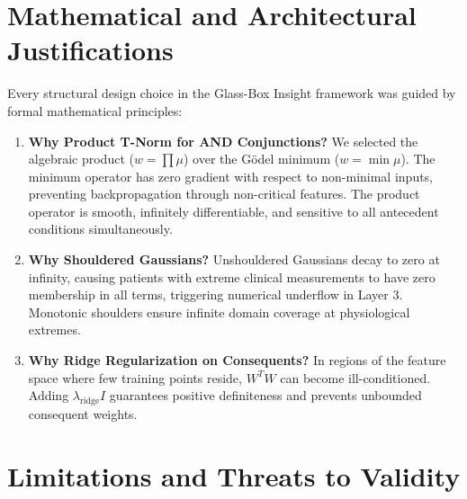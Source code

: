 \documentclass{report}
\begin{document}
\section{Mathematical and Architectural Justifications}

Every structural design choice in the Glass-Box Insight framework was guided by formal mathematical principles:
\begin{enumerate}
    \setlength{\itemsep}{1pt}
    \setlength{\parskip}{0pt}
    \item \textbf{Why Product T-Norm for AND Conjunctions?} We selected the algebraic product ($w = \prod \mu$) over the Gödel minimum ($w = \min \mu$). The minimum operator has zero gradient with respect to non-minimal inputs, preventing backpropagation through non-critical features. The product operator is smooth, infinitely differentiable, and sensitive to all antecedent conditions simultaneously.
    \item \textbf{Why Shouldered Gaussians?} Unshouldered Gaussians decay to zero at infinity, causing patients with extreme clinical measurements to have zero membership in all terms, triggering numerical underflow in Layer 3. Monotonic shoulders ensure infinite domain coverage at physiological extremes.
    \item \textbf{Why Ridge Regularization on Consequents?} In regions of the feature space where few training points reside, $W^T W$ can become ill-conditioned. Adding $\lambda_{\text{ridge}} I$ guarantees positive definiteness and prevents unbounded consequent weights.
\end{enumerate}

\section{Limitations and Threats to Validity}
\end{document}
